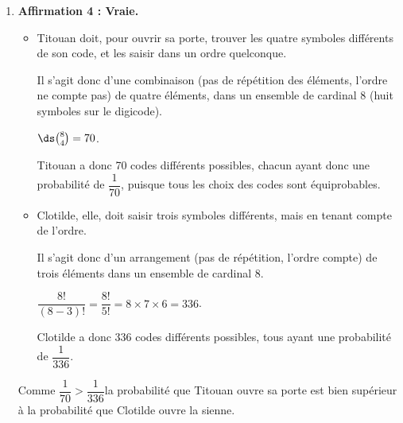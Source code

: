 \begin{enumerate}
\begin{enumerate}
			$\mathrm{CA} = \sqrt{1,5^2 + 3^2 + 3^2} = \sqrt{20,25} = 4,5$.\quad $\mathrm{CB} = \sqrt{0,5^2 + 4^2 + (-2)^2} = \sqrt{20,25} = 4,5$.

			On remarque donc (même si c'est hors sujet) que le triangle ACB est isocèle en C.

			En utilisant la définition trigonométrique du produit scalaire, on a :

			$\vectt{CA}\cdot\vectt{CB} = \mathrm{CA} \times \mathrm{CB} \times \cos\left(\widehat{\mathrm{ACB}}\right)$.

			En remplaçant les valeurs connues, on a :\quad $6,75 = 4,5 \times 4,5 \times \cos\left(\widehat{\mathrm{ACB}}\right)$,

			ce qui équivaut à \quad $\cos\left(\widehat{\mathrm{ACB}}\right) = \dfrac{6,75}{4,5^2} = \dfrac{1}{3}$.

			On en déduit :\quad $\widehat{\mathrm{ACB}} = \arccos\left(\dfrac{1}{3}\right) \approx 70,53$\,\textdegree.

			On a donc bien $\widehat{\mathrm{ACB}} \approx 70,5$\,\textdegree, à $10^{-1}$ près.
		\end{enumerate}

		\item \textbf{Affirmation 4 : Vraie.}

		\begin{itemize}[label=\textbullet~]
			\item Titouan doit, pour ouvrir sa porte, trouver les quatre symboles différents de son code, et les saisir dans un ordre quelconque.

			Il s'agit donc d'une combinaison (pas de répétition des éléments, l'ordre ne compte pas) de quatre éléments, dans un ensemble de cardinal 8 (huit symboles sur le digicode).

			$\ds \binom{8}{4} = 70$.

			Titouan a donc 70 codes différents possibles, chacun ayant donc une probabilité de $\dfrac{1}{70}$, puisque tous les choix des codes sont équiprobables.
			\item Clotilde, elle, doit saisir trois symboles différents, mais en tenant compte de l'ordre.

			Il s'agit donc d'un arrangement (pas de répétition, l'ordre compte) de trois éléments dans un ensemble de cardinal 8.

			$ \dfrac{8!}{(8-3)!} = \dfrac{8!}{5!} = 8\times 7 \times 6 = 336$.

			Clotilde a donc 336 codes différents possibles, tous ayant une probabilité de $\dfrac{1}{336}$.
		\end{itemize}

		Comme \quad $\dfrac{1}{70} > \dfrac{1}{336}$\quad la probabilité que Titouan ouvre sa porte est bien supérieur à la probabilité que Clotilde ouvre la sienne.
	\end{enumerate}
